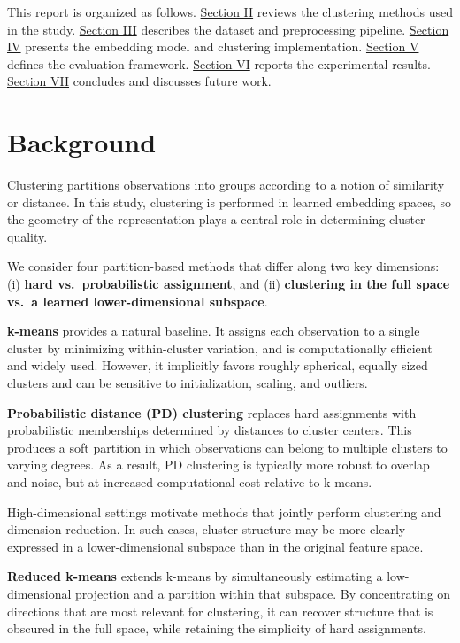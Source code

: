 \documentclass[
  11pt,
]{article}
\begin{document}
This report is organized as follows. \hyperref[background]{Section II}
reviews the clustering methods used in the study.
\hyperref[dataset]{Section III} describes the dataset and preprocessing
pipeline. \hyperref[methods-and-experimental-setup]{Section IV} presents
the embedding model and clustering implementation.
\hyperref[evaluation-framework]{Section V} defines the evaluation
framework. \hyperref[results]{Section VI} reports the experimental
results. \hyperref[conclusion-and-future-work]{Section VII} concludes
and discusses future work.

\section{Background}\label{background}

Clustering partitions observations into groups according to a notion of
similarity or distance. In this study, clustering is performed in
learned embedding spaces, so the geometry of the representation plays a
central role in determining cluster quality.

We consider four partition-based methods that differ along two key
dimensions: (i) \textbf{hard vs.~probabilistic assignment}, and (ii)
\textbf{clustering in the full space vs.~a learned lower-dimensional
subspace}.

\textbf{k-means} provides a natural baseline. It assigns each
observation to a single cluster by minimizing within-cluster variation,
and is computationally efficient and widely used. However, it implicitly
favors roughly spherical, equally sized clusters and can be sensitive to
initialization, scaling, and outliers.

\textbf{Probabilistic distance (PD) clustering} replaces hard
assignments with probabilistic memberships determined by distances to
cluster centers. This produces a soft partition in which observations
can belong to multiple clusters to varying degrees. As a result, PD
clustering is typically more robust to overlap and noise, but at
increased computational cost relative to k-means.

High-dimensional settings motivate methods that jointly perform
clustering and dimension reduction. In such cases, cluster structure may
be more clearly expressed in a lower-dimensional subspace than in the
original feature space.

\textbf{Reduced k-means} extends k-means by simultaneously estimating a
low-dimensional projection and a partition within that subspace. By
concentrating on directions that are most relevant for clustering, it
can recover structure that is obscured in the full space, while
retaining the simplicity of hard assignments.
\end{document}
